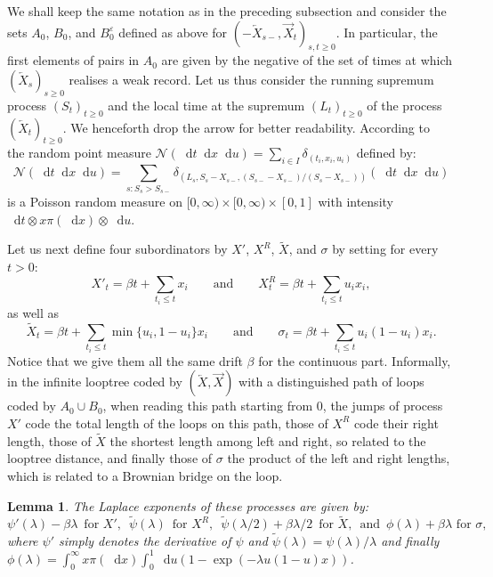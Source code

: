 \documentclass[british, a4paper,11pt]{article}
\numberwithin{equation}{section}
\newtheorem{lem}[thm]{Lemma}
\theoremstyle{definition}
\renewcommand{\d}{\mathop{}\!\mathrm{d}}
\begin{document}
We shall keep the same notation as in the preceding subsection and consider the sets $A_0$, $B_0$, and $B^\varepsilon_0$ defined as above for $(-\overleftarrow{X}_{s-}, \overrightarrow{X}_t)_{s,t \geq 0}$.
In particular, the first elements of pairs in $A_0$ are given by the negative of the set of times at which $(\overleftarrow{X}_s)_{s \geq 0}$ realises a weak record. Let us thus consider the running supremum process $(S_t)_{t \geq 0}$ and the local time at the supremum $(L_t)_{t \geq 0}$ of the process $(\overleftarrow{X}_t)_{t \geq 0}$. We henceforth drop the arrow for better readability.
According to~\cite[Equation~96]{DLG02} the random point measure $\mathscr{N}(\d t \d x \d u) = \sum_{i \in I} \delta_{(t_{i}, x_{i}, u_{i})}$ defined by:
\begin{equation}\label{eq:mesure_poisson_epine}
\mathscr{N}(\d t \d x \d u) = \sum_{s: S_{s} > S_{s-}} \delta_{(L_{s}, S_{s} - X_{s-}, (S_{s-} - X_{s-})/(S_{s} - X_{s-}))}(\d t \d x \d u)
\end{equation}
is a Poisson random measure on $[0,\infty) \times [0,\infty) \times [0,1]$ with intensity $\d t \otimes x \pi(\d x) \otimes \d u$.

Let us next define four subordinators by $X'$, $X^R$, $\widetilde{X}$, and $\sigma$ by setting for every $t > 0$:
\[X'_{t} = \beta t + \sum_{t_{i} \leq t} x_{i}
\qquad\text{and}\qquad 
X^R_{t} = \beta t +\sum_{t_{i} \leq t} u_{i} x_{i},\]
as well as
\[\widetilde{X}_{t} = \beta t +\sum_{t_{i} \leq t} \min\{u_{i}, 1-u_{i}\} x_{i}
\qquad\text{and}\qquad 
\sigma_{t} = \beta t +\sum_{t_{i} \leq t} u_{i} (1-u_{i}) x_{i}.\]
Notice that we give them all the same drift $\beta$ for the continuous part.
Informally, in the infinite looptree coded by $(\overleftarrow{X}, \overrightarrow{X})$ with a distinguished path of loops coded by $A_0 \cup B_0$, when reading this path starting from $0$, the jumps of process $X'$ code the total length of the loops on this path, those of $X^R$ code their right length, those of $\widetilde{X}$ the shortest length among left and right, so related to the looptree distance, and finally those of $\sigma$ the product of the left and right lengths, which is related to a Brownian bridge on the loop.



\begin{lem}\label{lem:loi_epine_looptree}
The Laplace exponents of these processes are given by:
\[\psi'(\lambda) - \beta \lambda \,\,\, \text{for } X',
\,\,\,
\widetilde{\psi}(\lambda) \,\,\,\text{for } X^R,
\,\,\,
\widetilde{\psi}(\lambda/2) + \beta \lambda / 2 \,\,\,\text{for } \widetilde{X},
\,\,\,
\text{and}
\,\,\,
\phi(\lambda)+\beta \lambda \,\,\text{for } \sigma
,\]
where $\psi'$ simply denotes the derivative of $\psi$ and $\widetilde{\psi}(\lambda) = \psi(\lambda) / \lambda$ and finally $\phi(\lambda) = \int_{0}^{\infty} x \pi(\d x) \int_{0}^{1} \d u (1 - \exp(- \lambda u(1-u) x))$.
\end{lem}
\end{document}
